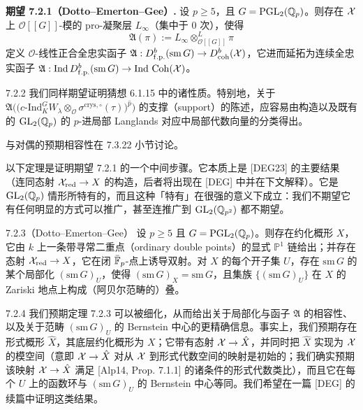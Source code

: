 \medskip
\noindent\textbf{期望 7.2.1（Dotto--Emerton--Gee）.}\label{exp:a4-7-2-1} 设 $p\ge5$，且 $G=\mathrm{PGL}_2(\mathbb{Q}_p)$。则存在 $\mathcal{X}$ 上 $\mathcal O[[G]]$-模的 pro-凝聚层 $L_\infty$（集中于 0 次），使得
\[
\mathfrak{A}(\pi):=L_\infty\otimes^{L}_{\mathcal O[[G]]}\pi
\]
定义 $\mathcal O$-线性正合全忠实函子 $\mathfrak{A}:D^b_{\mathrm{f.p.}}(\mathrm{sm}\,G)\to D^b_{\mathrm{coh}}(\mathcal{X})$，它进而延拓为连续全忠实函子 $\mathfrak{A}:\mathrm{Ind}\,D^b_{\mathrm{f.p.}}(\mathrm{sm}\,G)\to\mathrm{Ind}\,\operatorname{Coh}(\mathcal{X})$。

\begin{rem}{7.2.2}\label{rem:a4-7-2-2}
我们同样期望证明猜想 6.1.15 中的诸性质。特别地，关于 $\mathfrak{A}\bigl(\bigl(c\text{-}\mathrm{Ind}_K^GW_\lambda\otimes_{\mathcal O}\sigma^{\mathrm{crys},\circ}(\tau)\bigr)^{\hat p}\bigr)$ 的支撑（support）的陈述，应容易由构造以及既有的 $\mathrm{GL}_2(\mathbb{Q}_p)$ 的 $p$-进局部 Langlands 对应中局部代数向量的分类得出。

与对偶的预期相容性在 7.3.22 小节讨论。
\end{rem}

以下定理是证明期望 7.2.1 的一个中间步骤。它本质上是 [DEG23] 的主要结果（连同态射 $\mathcal{X}_{\mathrm{red}}\to X$ 的构造，后者将出现在 [DEG] 中并在下文解释）。它是 $\mathrm{GL}_2(\mathbb{Q}_p)$ 情形所特有的，而且这种「特有」在很强的意义下成立：我们不期望它有任何明显的方式可以推广，甚至连推广到 $\mathrm{GL}_2(\mathbb{Q}_{p^2})$ 都不期望。

\begin{thm}{7.2.3（Dotto--Emerton--Gee）}\label{thm:a4-7-2-3}
设 $p\ge5$ 且 $G=\mathrm{PGL}_2(\mathbb{Q}_p)$。则存在约化概形 $X$，它由 $k$ 上一条带寻常二重点（ordinary double points）的显式 $\mathbb P^1$ 链给出；并存在态射 $\mathcal{X}_{\mathrm{red}}\to X$，它在闭 $\bar{\mathbb{F}}_p$-点上诱导双射。对 $X$ 的每个开子集 $U$，存在 $\mathrm{sm}\,G$ 的某个局部化 $(\mathrm{sm}\,G)_U$，使得 $(\mathrm{sm}\,G)_X=\mathrm{sm}\,G$，且集族 $\{(\mathrm{sm}\,G)_U\}$ 在 $X$ 的 Zariski 地点上构成（阿贝尔范畴的）叠。
\end{thm}

\begin{rem}{7.2.4}\label{rem:a4-7-2-4}
我们预期定理 7.2.3 可以被细化，从而给出关于局部化与函子 $\mathfrak{A}$ 的相容性、以及关于范畴 $(\mathrm{sm}\,G)_U$ 的 Bernstein 中心的更精确信息。事实上，我们预期存在形式概形 $\hat X$，其底层约化概形为 $X$；它带有态射 $\mathcal{X}\to\hat X$，并同时把 $\hat X$ 实现为 $\mathcal{X}$ 的模空间（意即 $\mathcal{X}\to\hat X$ 对从 $\mathcal{X}$ 到形式代数空间的映射是初始的；我们确实预期该映射 $\mathcal{X}\to\hat X$ 满足 [Alp14, Prop. 7.1.1] 的诸条件的形式代数类比），而且它在每个 $U$ 上的函数环与 $(\mathrm{sm}\,G)_U$ 的 Bernstein 中心等同。我们希望在一篇 [DEG] 的续篇中证明这类结果。
\end{rem}

